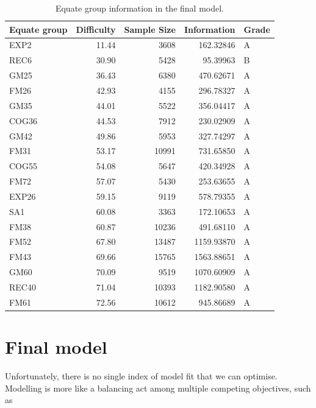 \documentclass[
]{book}
\begin{document}
\begin{table}

\caption{\label{tab:equateinfo}Equate group information in the final model.}
\centering
\begin{tabular}[t]{lrrrl}
\toprule
Equate group & Difficulty & Sample Size & Information & Grade\\
\midrule
EXP2 & 11.44 & 3608 & 162.32846 & A\\
REC6 & 30.90 & 5428 & 95.39963 & B\\
GM25 & 36.43 & 6380 & 470.62671 & A\\
FM26 & 42.93 & 4155 & 296.78327 & A\\
GM35 & 44.01 & 5522 & 356.04417 & A\\
\addlinespace
COG36 & 44.53 & 7912 & 230.02909 & A\\
GM42 & 49.86 & 5953 & 327.74297 & A\\
FM31 & 53.17 & 10991 & 731.65850 & A\\
COG55 & 54.08 & 5647 & 420.34928 & A\\
FM72 & 57.07 & 5430 & 253.63655 & A\\
\addlinespace
EXP26 & 59.15 & 9119 & 578.79355 & A\\
SA1 & 60.08 & 3363 & 172.10653 & A\\
FM38 & 60.87 & 10236 & 491.68110 & A\\
FM52 & 67.80 & 13487 & 1159.93870 & A\\
FM43 & 69.66 & 15765 & 1563.88651 & A\\
\addlinespace
GM60 & 70.09 & 9519 & 1070.60909 & A\\
REC40 & 71.04 & 10393 & 1182.90580 & A\\
FM61 & 72.56 & 10612 & 945.86689 & A\\
\bottomrule
\end{tabular}
\end{table}

\hypertarget{sec:finalmodel}{%
\section{Final model}\label{sec:finalmodel}}

Unfortunately, there is no single index of model fit that we can optimise. Modelling is more like a balancing act among multiple competing objectives, such as
\end{document}
